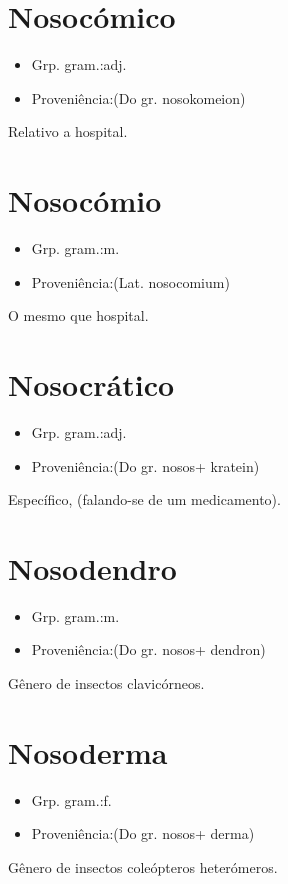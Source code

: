 \section{Nosocómico}
\begin{itemize}
\item {Grp. gram.:adj.}
\end{itemize}
\begin{itemize}
\item {Proveniência:(Do gr. \textunderscore nosokomeion\textunderscore )}
\end{itemize}
Relativo a hospital.
\section{Nosocómio}
\begin{itemize}
\item {Grp. gram.:m.}
\end{itemize}
\begin{itemize}
\item {Proveniência:(Lat. \textunderscore nosocomium\textunderscore )}
\end{itemize}
O mesmo que \textunderscore hospital\textunderscore .
\section{Nosocrático}
\begin{itemize}
\item {Grp. gram.:adj.}
\end{itemize}
\begin{itemize}
\item {Proveniência:(Do gr. \textunderscore nosos\textunderscore  + \textunderscore kratein\textunderscore )}
\end{itemize}
Específico, (falando-se de um medicamento).
\section{Nosodendro}
\begin{itemize}
\item {Grp. gram.:m.}
\end{itemize}
\begin{itemize}
\item {Proveniência:(Do gr. \textunderscore nosos\textunderscore  + \textunderscore dendron\textunderscore )}
\end{itemize}
Gênero de insectos clavicórneos.
\section{Nosoderma}
\begin{itemize}
\item {Grp. gram.:f.}
\end{itemize}
\begin{itemize}
\item {Proveniência:(Do gr. \textunderscore nosos\textunderscore  + \textunderscore derma\textunderscore )}
\end{itemize}
Gênero de insectos coleópteros heterómeros.
